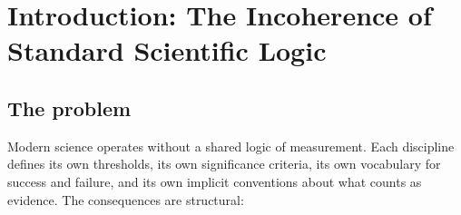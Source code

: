 \documentclass[
  aps,
  prd,
  twocolumn,
  superscriptaddress,
  nofootinbib,
  floatfix
]{revtex4-2}
\begin{document}
\section{Introduction: The Incoherence of Standard Scientific Logic}
\label{sec:intro}

\subsection{The problem}

Modern science operates without a shared logic of measurement.
Each discipline defines its own thresholds, its own significance
criteria, its own vocabulary for success and failure, and its own
implicit conventions about what counts as evidence.  The
consequences are structural:
\end{document}
